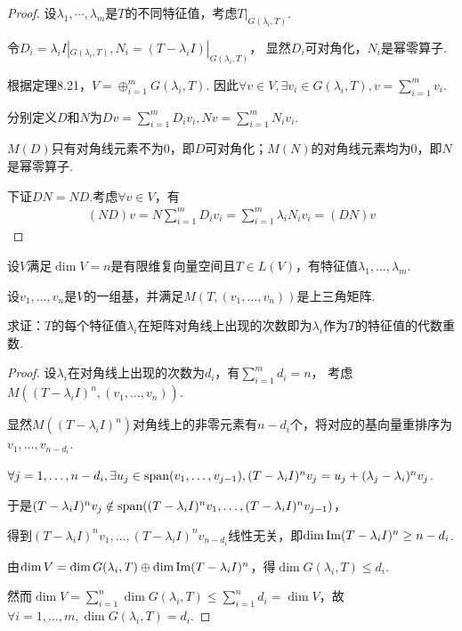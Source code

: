\begin{proof}
    设\(\lambda_1,\cdots,\lambda_m\)是\(T\)的不同特征值，考虑\(T|_{G(\lambda_i,T)}\).

    令\(D_i=\lambda_i I|_{G(\lambda_i,T)},N_i=(T-\lambda_i I)|_{G(\lambda_i,T)}\)，
    显然\(D_i\)可对角化，\(N_i\)是幂零算子.
    
    根据定理8.21，\(V=\oplus_{i=1}^m G(\lambda_i,T)\).
    因此\(\forall v \in V,\exists v_i \in G(\lambda_i,T),v=\sum_{i=1}^m v_i\).
    
    分别定义\(D\)和\(N\)为\(Dv=\sum_{i=1}^m D_iv_i,Nv=\sum_{i=1}^m N_iv_i\).
    
    \(M(D)\)只有对角线元素不为\(0\)，即\(D\)可对角化；\(M(N)\)的对角线元素均为\(0\)，即\(N\)是幂零算子.
    
    下证\(DN=ND\).考虑\(\forall v \in V\)，有
        \begin{align*}
            (ND)v=N\sum_{i=1}^m D_iv_i=\sum_{i=1}^m \lambda_iN_iv_i=(DN)v
        \end{align*}
\end{proof}

\begin{problem}[11]\label{8.B.11}
    设\(V\)满足\(\dim V=n\)是有限维复向量空间且\(T \in L(V)\)，有特征值\(\lambda_1,\dots,\lambda_m\).

    设\(v_1,\dots,v_n\)是\(V\)的一组基，并满足\(M(T,(v_1,\dots,v_n))\)是上三角矩阵.
    
    求证：\(T\)的每个特征值\(\lambda_i\)在矩阵对角线上出现的次数即为\(\lambda_i\)作为\(T\)的特征值的代数重数.
\end{problem}

\begin{proof}
    设\(\lambda_i\)在对角线上出现的次数为\(d_i\)，有\(\sum_{i=1}^m d_i=n\)，
    考虑\(M((T-\lambda_i I)^n, (v_1, \dots, v_n))\).

    显然\(M((T-\lambda_i I)^n)\)对角线上的非零元素有\(n-d_i\)个，将对应的基向量重排序为\(v_1, \dots, v_{n-d_i}\).

    \(\forall j=1, \dots, n-d_i, \exists u_j \in \operatorname{span}(v_1, \dots, v_{j-1}), (T-\lambda_i I)^n v_j=u_j+(\lambda_j-\lambda_i)^n v_j\).

    于是\((T-\lambda_i I)^n v_j \notin \operatorname{span}((T-\lambda_i I)^n v_1, \dots, (T-\lambda_i I)^n v_{j-1})\)，

    得到\((T-\lambda_i I)^n v_1, \dots, (T-\lambda_i I)^n v_{n-d_i}\)线性无关，即\(\dim \operatorname{Im}(T-\lambda_i I)^n \geq n-d_i\).

    由\(\dim V=\dim G(\lambda_i,T) \oplus \dim \operatorname{Im}(T-\lambda_i I)^n\)，得\(\dim G(\lambda_i,T) \leq d_i\).

    然而\(\dim V=\sum_{i=1}^n \dim G(\lambda_i,T) \leq \sum_{i=1}^n d_i=\dim V\)，故\(\forall i=1, \dots, m, \dim G(\lambda_i,T)=d_i\).
\end{proof}

